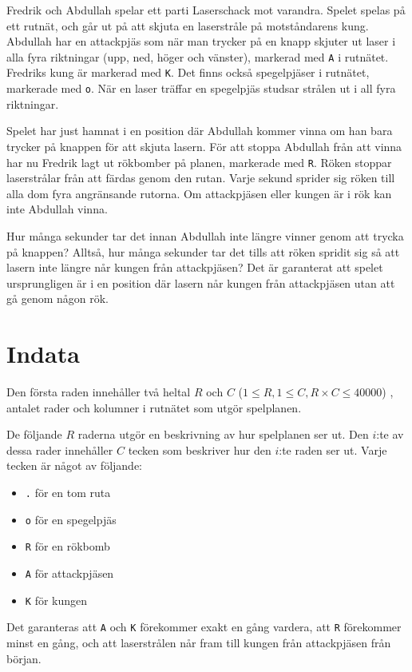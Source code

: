 Fredrik och Abdullah spelar ett parti Laserschack mot varandra. Spelet spelas på ett rutnät,
och går ut på att skjuta en laserstråle på motståndarens kung.
Abdullah har en attackpjäs som när man trycker på en knapp skjuter ut laser i alla fyra riktningar (upp, ned, höger och vänster), markerad med \texttt{A} i rutnätet.
Fredriks kung är markerad med \texttt{K}. Det finns också spegelpjäser i rutnätet, markerade med \texttt{o}.
När en laser träffar en spegelpjäs studsar strålen ut i all fyra riktningar.

Spelet har just hamnat i en position där Abdullah kommer vinna om han bara trycker på knappen för att skjuta lasern.
För att stoppa Abdullah från att vinna har nu Fredrik lagt ut rökbomber på planen, markerade med \texttt{R}.
Röken stoppar laserstrålar från att färdas genom den rutan. Varje sekund sprider sig röken till alla dom fyra angränsande rutorna.
Om attackpjäsen eller kungen är i rök kan inte Abdullah vinna. 

Hur många sekunder tar det innan Abdullah inte längre vinner genom att trycka på knappen?
Alltså, hur många sekunder tar det tills att röken spridit sig så att lasern inte längre når kungen från attackpjäsen?
Det är garanterat att spelet ursprungligen är i en position där lasern når kungen från attackpjäsen utan att gå genom någon rök.

\section*{Indata}
Den första raden innehåller två heltal $R$ och $C$ ($1\le R, 1 \le C, R\times C \le 40 000$) , antalet rader och kolumner i rutnätet som utgör spelplanen.

De följande $R$ raderna utgör en beskrivning av hur spelplanen ser ut.
Den $i$:te av dessa rader innehåller $C$ tecken som beskriver hur den $i$:te raden ser ut.
Varje tecken är något av följande:
\begin{itemize}
    \item \texttt{.} för en tom ruta
    \item \texttt{o} för en spegelpjäs
    \item \texttt{R} för en rökbomb
    \item \texttt{A} för attackpjäsen
    \item \texttt{K} för kungen
\end{itemize}
Det garanteras att \texttt{A} och \texttt{K} förekommer exakt en gång vardera,
att \texttt{R} förekommer minst en gång,
och att laserstrålen når fram till kungen från attackpjäsen från början.

